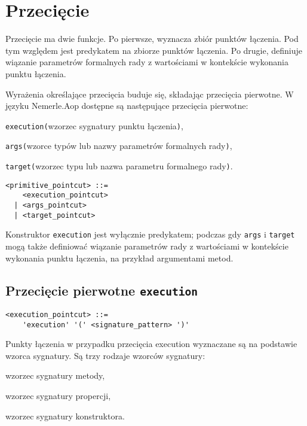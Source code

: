 \documentclass[a4paper,12pt]{mwbk}
\begin{document}


\section{Przecięcie}

Przecięcie ma dwie funkcje. Po pierwsze, wyznacza zbiór
punktów łączenia.  Pod tym względem jest predykatem na zbiorze punktów
łączenia. Po drugie, definiuje wiązanie parametrów formalnych rady z
wartościami w kontekście wykonania punktu łączenia. 

Wyrażenia określające przecięcia buduje się, składając przecięcia pierwotne. 
W języku Nemerle.Aop dostępne są następujące przecięcia pierwotne:
\begin{itemize*}
    \item \lstinline!execution(!wzorzec sygnatury punktu łączenia\lstinline!)!,
    \item \lstinline!args(!wzorce typów lub nazwy parametrów formalnych rady\lstinline!)!,
    \item \lstinline!target(!wzorzec typu lub nazwa parametru formalnego rady\lstinline!)!.
\end{itemize*}

\begin{lstlisting}[style=grammar] 
<primitive_pointcut> ::= 
    <execution_pointcut>
  | <args_pointcut>
  | <target_pointcut>
\end{lstlisting}

Konstruktor \lstinline!execution! jest wyłącznie predykatem; podczas gdy
\lstinline!args! i \lstinline!target! mogą także definiować wiązanie parametrów
rady z wartościami w kontekście wykonania punktu łączenia, na przykład argumentami metod.

\subsection{Przecięcie pierwotne \lstinline!execution!}

\begin{lstlisting}[style=grammar]
<execution_pointcut> ::=
    'execution' '(' <signature_pattern> ')'
\end{lstlisting}

Punkty łączenia w przypadku przecięcia execution wyznaczane są na podstawie
wzorca sygnatury. Są trzy rodzaje wzorców sygnatury:
\begin{itemize*}
    \item wzorzec sygnatury metody,
    \item wzorzec sygnatury propercji,
    \item wzorzec sygnatury konstruktora.
\end{itemize*}
\end{document}
